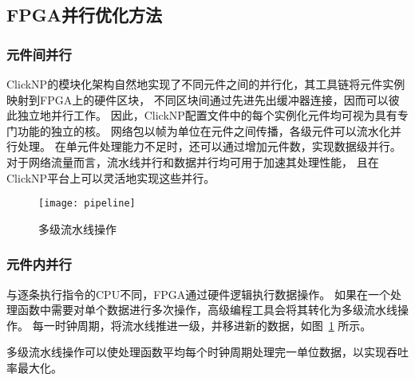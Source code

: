 \subsection{FPGA并行优化方法}
\subsubsection{元件间并行}
ClickNP的模块化架构自然地实现了不同元件之间的并行化，其工具链将元件实例映射到FPGA上的硬件区块，
不同区块间通过先进先出缓冲器连接，因而可以彼此独立地并行工作。
因此，ClickNP配置文件中的每个实例化元件均可视为具有专门功能的独立的核。
网络包以帧为单位在元件之间传播，各级元件可以流水化并行处理。
在单元件处理能力不足时，还可以通过增加元件数，实现数据级并行。
对于网络流量而言，流水线并行和数据并行均可用于加速其处理性能，
且在ClickNP平台上可以灵活地实现这些并行。

\begin{figure}[htbp]
\centering
\texttt{[image: pipeline]}
\caption{多级流水线操作}\label{fig:pipeline}
\end{figure}

\subsubsection{元件内并行}
与逐条执行指令的CPU不同，FPGA通过硬件逻辑执行数据操作。
如果在一个处理函数中需要对单个数据进行多次操作，高级编程工具会将其转化为多级流水线操作。
每一时钟周期，将流水线推进一级，并移进新的数据，如图~\ref{fig:pipeline} 所示。

多级流水线操作可以使处理函数平均每个时钟周期处理完一单位数据，以实现吞吐率最大化。
